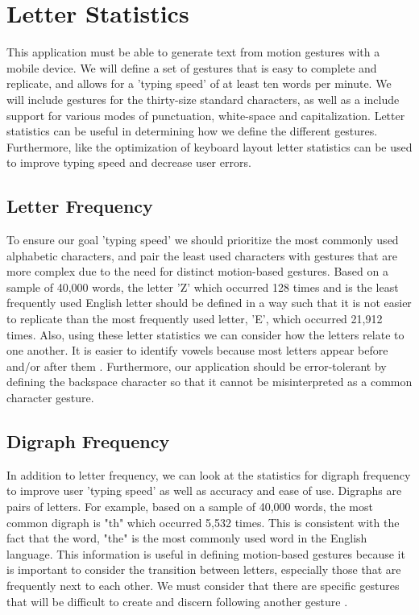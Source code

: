 \documentclass[onecolumn, draftclsnofoot,10pt, journal, letterpaper]{IEEEtran}
\begin{document}
\section{Letter Statistics}
    This application must be able to generate text from motion gestures with a mobile device. We will define a set of gestures that is easy to complete and replicate, and allows for a 'typing speed' of at least ten words per minute. We will include gestures for the thirty-size standard characters, as well as a include support for various modes of punctuation, white-space and capitalization. Letter statistics can be useful in determining how we define the different gestures. Furthermore, like the optimization of keyboard layout letter statistics can be used to improve typing speed and decrease user errors.
    \subsection{Letter Frequency}
        To ensure our goal 'typing speed' we should prioritize the most commonly used alphabetic characters, and pair the least used characters with gestures that are more complex due to the need for distinct motion-based gestures. Based on a sample of 40,000 words, the letter 'Z' which occurred 128 times and is the least frequently used English letter should be defined in a way such that it is not easier to replicate than the most frequently used letter, 'E', which occurred 21,912 times. Also, using these letter statistics we can consider how the letters relate to one another. It is easier to identify vowels because most letters appear before and/or after them \cite{englishletter}. Furthermore, our application should be error-tolerant by defining the backspace character so that it cannot be misinterpreted as a common character gesture.
    \subsection{Digraph Frequency}
        In addition to letter frequency, we can  look at the statistics for digraph frequency to improve user 'typing speed' as well as accuracy and ease of use. Digraphs are pairs of letters. For example, based on a sample of 40,000 words, the most common digraph is "th" which occurred 5,532 times. This is consistent with the fact that the word, "the" is the most commonly used word in the English language. This information is useful in defining motion-based gestures because it is important to consider the transition between letters, especially those that are frequently next to each other. We must consider that there are specific gestures that will be difficult to create and discern following another gesture \cite{digraph}.
\end{document}
